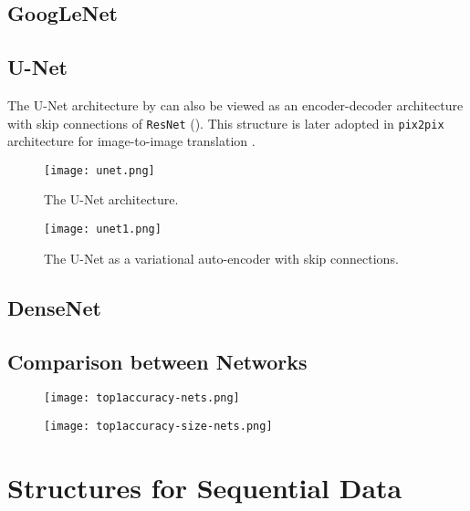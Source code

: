\subsection{GoogLeNet}
\todo{}

\subsection{U-Net}
The U-Net architecture by  can also be viewed as an encoder-decoder architecture \cite{kingma2013auto} with skip connections of \texttt{ResNet} (). This structure is later adopted in \texttt{pix2pix} architecture for image-to-image translation \cite{isola2017image}.
\begin{figure}[hbt!]
	\centering
	\texttt{[image: unet.png]}
	\caption{The U-Net architecture. \cite{ronneberger2015u}}
\end{figure}
\begin{figure}[hbt!]
	\centering
	\texttt{[image: unet1.png]}
	\caption{The U-Net as a variational auto-encoder with skip connections. \cite{isola2017image}}
	\label{fig:unet1}
\end{figure}


\subsection{DenseNet}
\todo{} 

\subsection{Comparison between Networks}
\begin{figure}[hbt!]
	\centering
	\begin{minipage}{.5\textwidth}
		\centering
		\texttt{[image: top1accuracy-nets.png]}
		\label{fig:top1accuracy-nets}
	\end{minipage}%
	\begin{minipage}{.5\textwidth}
		\centering
		\texttt{[image: top1accuracy-size-nets.png]}
		\label{fig:top1accuracy-size-nets}
	\end{minipage}
\end{figure}

\section{Structures for Sequential Data}
